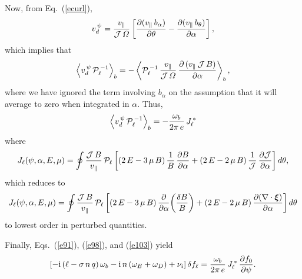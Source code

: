 \documentclass[12pt,prb,aps,notitlepage]{revtex4-1}
\newcommand{\bxi}{\mbox{\boldmath$\xi$}}
\begin{document}
 Now, from Eq.~(\ref{ecurl}), 
 \begin{equation}\label{e101}
 v_d^{\,\psi}= \frac{v_\parallel}{{\cal J}\,{\mit\Omega}}\left[\frac{\partial (v_\parallel\,b_\alpha)}{\partial\theta} - \frac{\partial (v_\parallel\,b_\theta)}{\partial \alpha}\right],
 \end{equation}
 which implies that 
 \begin{equation}
 \left\langle v_d^{\,\psi}\,{\cal P}_{\ell}^{\,-1}\right\rangle_b = -\left\langle{\cal P}_{\ell}^{\,-1}\, \frac{v_\parallel}{{\cal J}\,{\mit\Omega}}\,\frac{\partial \,(v_\parallel\,{\cal J}\,B)}{\partial\alpha}\right\rangle_b,
 \end{equation}
 where we have ignored the term involving $b_\alpha$ on the assumption that it will average to zero when integrated in $\alpha$. 
 Thus,
 \begin{equation}\label{e103}
 \left\langle v_d^{\,\psi}\,{\cal P}_{\ell}^{\,-1}\right\rangle_b =-\frac{\omega_b}{2\pi\,e}\,J_{\ell}^{\,\ast}
 \end{equation}
 where
 \begin{equation}
 J_\ell(\psi,\alpha,E,\mu)= \oint
 \frac{{\cal J}\,B}{v_\parallel}\,{\cal P}_{\ell}
 \left[(2\,E-3\,\mu\,B)\,\frac{1}{B}\,\frac{\partial B}{\partial \alpha} + (2\,E-2\,\mu\,B)\,\frac{1}{{\cal J}}\,\frac{\partial
 {\cal J}}{\partial\alpha}\right]d\theta,
 \end{equation}
 which reduces to 
 \begin{equation}\label{e126}
 J_\ell(\psi,\alpha,E,\mu)= \oint 
 \frac{{\cal J}\,B}{v_\parallel}\,{\cal P}_{\ell}
 \left[(2\,E-3\,\mu\,B)\,\frac{\partial }{\partial \alpha} \!\left(\frac{\delta B}{B}\right)+ (2\,E-2\,\mu\,B)\,\frac{\partial
(\nabla\cdot\bxi)}{\partial\alpha}\right]d\theta
 \end{equation}
 to lowest order in perturbed quantities. 
 
 Finally, Eqs.~(\ref{e91}), (\ref{e98}), and (\ref{e103}) yield
 \begin{equation}\label{e128}
 \left[-{\rm i}\,(\ell - \sigma\,n\,q)\,\omega_b -{\rm i}\,n\,(\omega_E+\omega_D) + \nu_i\right]\delta f_\ell = \frac{\omega_b}{2\pi\,e}\,J_\ell^{\,\ast}\,\frac{\partial f_0}{\partial \psi}.
 \end{equation}
 
\end{document}
